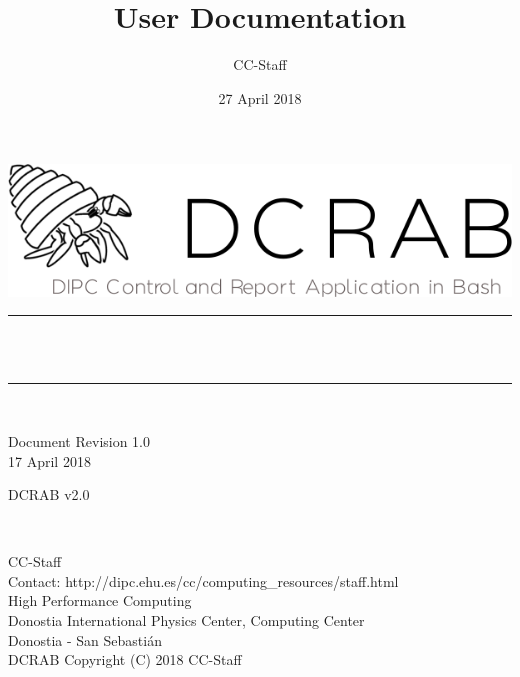 \documentclass[10pt,a4paper]{report}
\author{CC-Staff}
\title{User Documentation}
\date{27 April 2018}
\makeatletter
\let\thetitle\@title
\makeatother
\begin{document}

\begin{titlepage}
	\centering
    \vspace*{3 cm}
    \includegraphics[scale = 0.6]{../auxFiles/logos/DCRAB_logo.png}\\[1.0 cm]
		\vspace*{2 cm}
	\rule{\linewidth}{0.2 mm} \\[0.4 cm]
	{ \huge \bfseries \thetitle}\\
	\rule{\linewidth}{0.2 mm} \\[0.4 cm]
\vspace*{4.5 cm}
	\begin{minipage}{0.4\textwidth}
		\begin{flushleft} \large
			Document Revision 1.0\\
			17 April 2018\\
			\end{flushleft}
			\end{minipage}
			\begin{minipage}{0.4 \textwidth}
			\begin{flushright} \large
			DCRAB v2.0\\
		\end{flushright}
	\end{minipage}\\[2 cm]

\newpage
\thispagestyle{empty}
\begin{flushleft}
CC-Staff \\
Contact: http://dipc.ehu.es/cc/computing\_resources/staff.html \\
High Performance Computing \\
Donostia International Physics Center, Computing Center \\
Donostia - San Sebasti\'an \\
\vspace{1cm}
DCRAB Copyright (C) 2018 CC-Staff
\end{flushleft}

\newpage
\end{titlepage}
\end{document}
